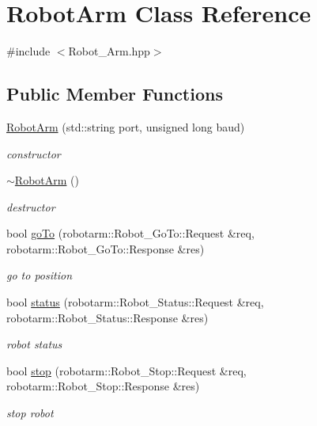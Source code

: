 \hypertarget{class_robot_arm}{}\section{Robot\+Arm Class Reference}
\label{class_robot_arm}


{\ttfamily \#include $<$Robot\+\_\+\+Arm.\+hpp$>$}

\subsection*{Public Member Functions}
\begin{DoxyCompactItemize}
\item 
\hyperlink{class_robot_arm_aa3324f162a64eeb345cb6d2845f3822c}{Robot\+Arm} (std\+::string port, unsigned long baud)
\begin{DoxyCompactList}\small\item\em constructor \end{DoxyCompactList}\item 
\hyperlink{class_robot_arm_af3cf87fd2b5b060625eb49317632b83c}{$\sim$\+Robot\+Arm} ()
\begin{DoxyCompactList}\small\item\em destructor \end{DoxyCompactList}\item 
bool \hyperlink{class_robot_arm_a8b44092b92f889600d3e712c292b9c48}{go\+To} (robotarm\+::\+Robot\+\_\+\+Go\+To\+::\+Request \&req, robotarm\+::\+Robot\+\_\+\+Go\+To\+::\+Response \&res)
\begin{DoxyCompactList}\small\item\em go to position \end{DoxyCompactList}\item 
bool \hyperlink{class_robot_arm_a9bc2cbb9fb6252afffd43ed2a5f6113e}{status} (robotarm\+::\+Robot\+\_\+\+Status\+::\+Request \&req, robotarm\+::\+Robot\+\_\+\+Status\+::\+Response \&res)
\begin{DoxyCompactList}\small\item\em robot status \end{DoxyCompactList}\item 
bool \hyperlink{class_robot_arm_a645e7400a9e29525385d07e0b9552eb4}{stop} (robotarm\+::\+Robot\+\_\+\+Stop\+::\+Request \&req, robotarm\+::\+Robot\+\_\+\+Stop\+::\+Response \&res)
\begin{DoxyCompactList}\small\item\em stop robot \end{DoxyCompactList}\end{DoxyCompactItemize}


